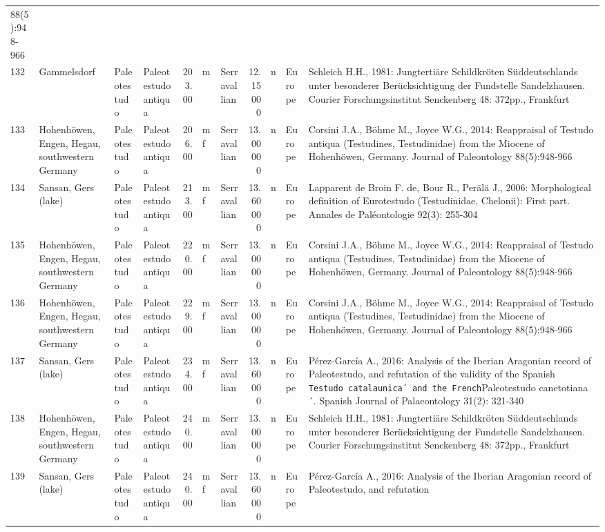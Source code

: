 \documentclass[]{article}
\begin{document}
\begin{longtable}[]{@{}llllrllrlll@{}}
88(5):948-966\tabularnewline
132 & Gammelsdorf & Paleotestudo & Paleotestudo antiqua & 203.00 & m &
Serravallian & 12.15000 & n & Europe & Schleich H.H., 1981: Jungtertiäre
Schildkröten Süddeutschlands unter besonderer Berücksichtigung der
Fundstelle Sandelzhausen. Courier Forschungsinstitut Senckenberg 48:
372pp., Frankfurt\tabularnewline
133 & Hohenhöwen, Engen, Hegau, southwestern Germany & Paleotestudo &
Paleotestudo antiqua & 206.00 & mf & Serravallian & 13.00000 & n &
Europe & Corsini J.A., Böhme M., Joyce W.G., 2014: Reappraisal of
Testudo antiqua (Testudines, Testudinidae) from the Miocene of
Hohenhöwen, Germany. Journal of Paleontology
88(5):948-966\tabularnewline
134 & Sansan, Gers (lake) & Paleotestudo & Paleotestudo antiqua & 213.00
& mf & Serravallian & 13.60000 & n & Europe & Lapparent de Broin F. de,
Bour R., Perälä J., 2006: Morphological definition of Eurotestudo
(Testudinidae, Chelonii): First part. Annales de Paléontologie 92(3):
255-304\tabularnewline
135 & Hohenhöwen, Engen, Hegau, southwestern Germany & Paleotestudo &
Paleotestudo antiqua & 220.00 & mf & Serravallian & 13.00000 & n &
Europe & Corsini J.A., Böhme M., Joyce W.G., 2014: Reappraisal of
Testudo antiqua (Testudines, Testudinidae) from the Miocene of
Hohenhöwen, Germany. Journal of Paleontology
88(5):948-966\tabularnewline
136 & Hohenhöwen, Engen, Hegau, southwestern Germany & Paleotestudo &
Paleotestudo antiqua & 229.00 & mf & Serravallian & 13.00000 & n &
Europe & Corsini J.A., Böhme M., Joyce W.G., 2014: Reappraisal of
Testudo antiqua (Testudines, Testudinidae) from the Miocene of
Hohenhöwen, Germany. Journal of Paleontology
88(5):948-966\tabularnewline
137 & Sansan, Gers (lake) & Paleotestudo & Paleotestudo antiqua & 234.00
& mf & Serravallian & 13.60000 & n & Europe & Pérez-García A., 2016:
Analysis of the Iberian Aragonian record of Paleotestudo, and refutation
of the validity of the Spanish
\texttt{Testudo\ catalaunica´\ and\ the\ French}Paleotestudo
canetotiana´. Spanish Journal of Palaeontology 31(2):
321-340\tabularnewline
138 & Hohenhöwen, Engen, Hegau, southwestern Germany & Paleotestudo &
Paleotestudo antiqua & 240.00 & m & Serravallian & 13.00000 & n & Europe
& Schleich H.H., 1981: Jungtertiäre Schildkröten Süddeutschlands unter
besonderer Berücksichtigung der Fundstelle Sandelzhausen. Courier
Forschungsinstitut Senckenberg 48: 372pp., Frankfurt\tabularnewline
139 & Sansan, Gers (lake) & Paleotestudo & Paleotestudo antiqua & 240.00
& mf & Serravallian & 13.60000 & n & Europe & Pérez-García A., 2016:
Analysis of the Iberian Aragonian record of Paleotestudo, and refutation

\end{longtable}
\end{document}
